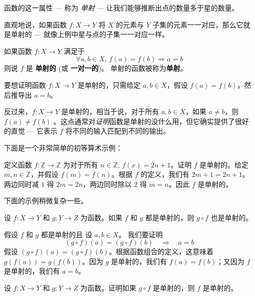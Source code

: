 函数的这一属性 --- 称为 \textit{单射} --- 让我们能够推断出点的数量多于星的数量。

直观地说，如果函数 $f : X \to Y$ 将 $X$ 的元素与 $Y$ 子集的元素一一对应，那么它就是单射的 --- 就像上例中星与点的子集一一对应一样。

\begin{definition}
\label{defInjective}\label{defInjection}
如果函数 $f : X \to Y$ 满足于
\[ \forall a,b \in X,\, f(a) = f(b) \Rightarrow a=b \]
则说 $f$ 是 \textbf{单射的} (或 \textbf{一对一的})。
单射的函数被称为\textbf{单射}。
\end{definition}

\begin{strategy}[证明函数是单射的]
要想证明函数 $f : X \to Y$ 是单射的，只需给定 $a,b \in X$，假设 $f(a)=f(b)$，然后推导出 $a=b$。
\end{strategy}

反过来，$f : X \to Y$ 是单射的，相当于说，对于所有 $a,b \in X$，如果 $a \ne b$，则 $f(a) \ne f(b)$ 。这点通常对\textit{证明}函数是单射的没什么用，但它确实提供了很好的直觉 --- 它表示 $f$ 将不同的输入匹配到不同的输出。

下面是一个非常简单的初等算术示例：
\begin{example}
定义函数 $f : \mathbb{Z} \to \mathbb{Z}$ 为对于所有 $n \in \mathbb{Z}$, $f(x) = 2n+1$。证明 $f$ 是单射的。给定 $m, n \in \mathbb{Z}$，并假设 $f(m)=f(n)$。根据 $f$ 的定义，我们有 $2m+1=2n+1$。两边同时减 $1$ 得 $2m=2n$，两边同时除以 $2$ 得 $m=n$。因此 $f$ 是单射的。
\end{example}

下面的示例稍微复杂一些。

\begin{proposition}
\label{propCompositeOfInjectionsIsInjection}
设 $f : X \to Y$ 和 $g : Y \to Z$ 为函数。如果 $f$ 和 $g$ 都是单射的，则 $g \circ f$ 也是单射的。
\end{proposition}
\begin{cproof}
假设 $f$ 和 $g$ 都是单射的且
设 $a,b \in X$。
我们要证明
\[ (g \circ f)(a) = (g \circ f)(b) \quad \Rightarrow \quad a=b \]
假设 $(g \circ f)(a) = (g \circ f)(b)$。根据函数组合的定义，这意味着 $g(f(a))=g(f(b))$。因为 $g$ 是单射的，我们有 $f(a)=f(b)$；又因为 $f$ 是单射的，我们有 $a=b$。
\end{cproof}

\begin{exercise}
设 $f : X \to Y$ 和 $g : Y \to Z$ 为函数。证明如果 $g \circ f$ 是单射的，则 $f$ 是单射的。
\end{exercise}

